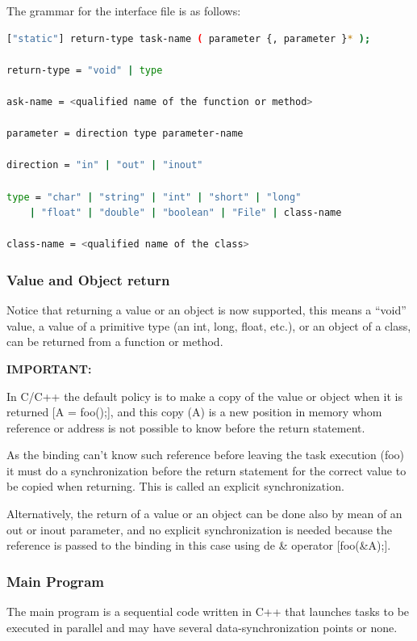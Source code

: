 The grammar for the interface file is as follows:

\begin{lstlisting}[language=bash]
["static"] return-type task-name ( parameter {, parameter }* );

return-type = "void" | type

ask-name = <qualified name of the function or method>

parameter = direction type parameter-name

direction = "in" | "out" | "inout"

type = "char" | "string" | "int" | "short" | "long"
    | "float" | "double" | "boolean" | "File" | class-name

class-name = <qualified name of the class>
\end{lstlisting}

       
\subsubsection{Value and Object return}
Notice that returning a value or an object is now supported, this means a ``void'' value, a value 
of a primitive type (an int, long, float, etc.), or an object of a class, can be returned from a 
function or method.

{\bf IMPORTANT:}

In C/C++ the default policy is to make a copy of the value or object when it is returned [A = foo();], 
and this copy (A) is a new position in memory whom reference or address is not possible to know before 
the return statement.

As the binding can’t know such reference before leaving the task execution (foo) it must do a 
synchronization before the return statement for the correct value to be copied when returning. 
This is called an explicit synchronization.

Alternatively, the return of a value or an object can be done also by mean of an out or inout parameter, 
and no explicit synchronization is needed because the reference is passed to the binding in this case 
using de \& operator [foo(\&A);].

\subsubsection{Main Program}
The main program is a sequential code written in C++ that launches tasks to be executed in parallel 
and may have several data-synchronization points or none.

